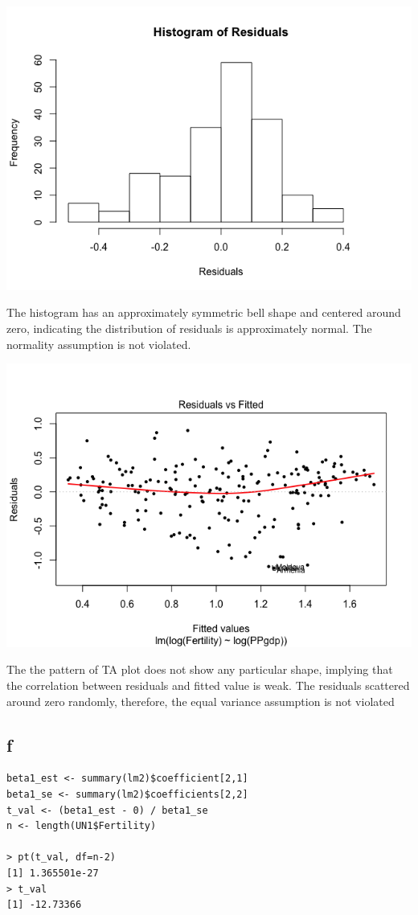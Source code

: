 \documentclass[11pt,letterpaper]{article}
\begin{document}
\includegraphics[scale=0.6]{2-e-1.png}

\noindent The histogram has an approximately symmetric bell shape and centered around zero, indicating the distribution of residuals is approximately normal. The normality assumption is not violated. 

\includegraphics[scale=0.6]{2-e-2.png}

The the pattern of TA plot does not show any particular shape, implying that the correlation between residuals and fitted value is weak. The residuals scattered around zero randomly, therefore, the equal variance assumption is not violated

\subsection*{f}
\begin{verbatim}
beta1_est <- summary(lm2)$coefficient[2,1]
beta1_se <- summary(lm2)$coefficients[2,2]
t_val <- (beta1_est - 0) / beta1_se
n <- length(UN1$Fertility)

> pt(t_val, df=n-2)
[1] 1.365501e-27
> t_val
[1] -12.73366
\end{verbatim}
\end{document}
